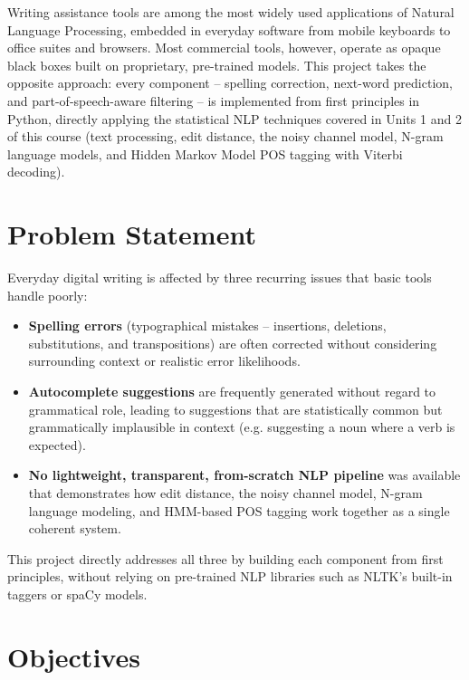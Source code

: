 \documentclass[12pt,a4paper]{report}
\begin{document}
Writing assistance tools are among the most widely used applications of
Natural Language Processing, embedded in everyday software from mobile
keyboards to office suites and browsers. Most commercial tools, however,
operate as opaque black boxes built on proprietary, pre-trained models.
This project takes the opposite approach: every component -- spelling
correction, next-word prediction, and part-of-speech-aware filtering -- is
implemented from first principles in Python, directly applying the
statistical NLP techniques covered in Units 1 and 2 of this course (text
processing, edit distance, the noisy channel model, N-gram language
models, and Hidden Markov Model POS tagging with Viterbi decoding).

\section{Problem Statement}

Everyday digital writing is affected by three recurring issues that basic
tools handle poorly:
\begin{itemize}
    \item \textbf{Spelling errors} (typographical mistakes --
    insertions, deletions, substitutions, and transpositions) are often
    corrected without considering surrounding context or realistic error
    likelihoods.
    \item \textbf{Autocomplete suggestions} are frequently generated
    without regard to grammatical role, leading to suggestions that are
    statistically common but grammatically implausible in context (e.g.
    suggesting a noun where a verb is expected).
    \item \textbf{No lightweight, transparent, from-scratch NLP pipeline}
    was available that demonstrates how edit distance, the noisy channel
    model, N-gram language modeling, and HMM-based POS tagging work
    together as a single coherent system.
\end{itemize}

This project directly addresses all three by building each component from
first principles, without relying on pre-trained NLP libraries such as
NLTK's built-in taggers or spaCy models.

\section{Objectives}
\end{document}
